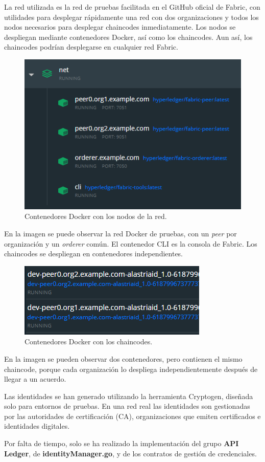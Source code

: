 La red utilizada es la red de pruebas facilitada en el GitHub oficial de Fabric, con utilidades para desplegar rápidamente una red con dos organizaciones y todos los nodos necesarios para desplegar chaincodes inmediatamente. Los nodos se despliegan mediante contenedores Docker, así como los chaincodes. Aun así, los chaincodes podrían desplegarse en cualquier red Fabric.
\begin{figure}[H]
\centerline{\includegraphics[scale=0.9]{recursos/network-daocker.png}}
\caption{Contenedores Docker con los nodos de la red.}
\label{docker-net}
\end{figure}
En la imagen se puede observar la red Docker de pruebas, con un \textit{peer} por organización y un \textit{orderer} común. El contenedor CLI es la consola de Fabric. Los chaincodes se despliegan en contenedores independientes.

\begin{figure}[H]
\centerline{\includegraphics[scale=0.9]{recursos/chaincodes-docker.png}}
\caption{Contenedores Docker con los chaincodes.}
\label{chaincodes-docker}
\end{figure}
En la imagen se pueden observar dos contenedores, pero contienen el mismo chaincode, porque cada organización lo despliega independientemente después de llegar a un acuerdo.

Las identidades se han generado utilizando la herramienta Cryptogen, diseñada solo para entornos de pruebas. En una red real las identidades son gestionadas por las autoridades de certificación (CA), organizaciones que emiten certificados e identidades digitales. 

Por falta de tiempo, solo se ha realizado la implementación del grupo \textbf{API Ledger}, de \textbf{identityManager.go}, y de los contratos de gestión de credenciales.